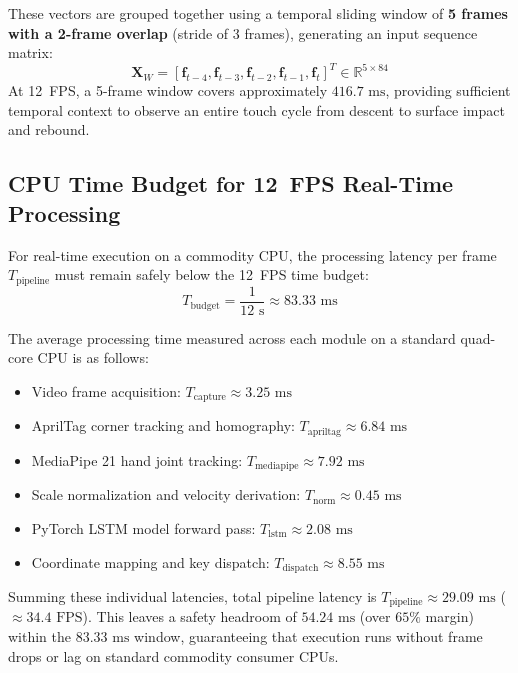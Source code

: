 These vectors are grouped together using a temporal sliding window of \textbf{5 frames with a 2-frame overlap} (stride of 3 frames), generating an input sequence matrix:
\begin{equation}
\mathbf{X}_W = \left[ \mathbf{f}_{t-4}, \mathbf{f}_{t-3}, \mathbf{f}_{t-2}, \mathbf{f}_{t-1}, \mathbf{f}_t \right]^T \in \mathbb{R}^{5 \times 84}
\label{eq:meth_window_matrix}
\end{equation}
At 12~FPS, a 5-frame window covers approximately $416.7\text{ ms}$, providing sufficient temporal context to observe an entire touch cycle from descent to surface impact and rebound.

\subsection{CPU Time Budget for 12~FPS Real-Time Processing}
\label{subsec:meth_timing_budget}
For real-time execution on a commodity CPU, the processing latency per frame $T_{\text{pipeline}}$ must remain safely below the 12~FPS time budget:
\begin{equation}
T_{\text{budget}} = \frac{1}{12\text{ s}} \approx 83.33\text{ ms}
\label{eq:meth_timing_budget}
\end{equation}

The average processing time measured across each module on a standard quad-core CPU is as follows:
\begin{itemize}
    \item Video frame acquisition: $T_{\text{capture}} \approx 3.25\text{ ms}$
    \item AprilTag corner tracking and homography: $T_{\text{apriltag}} \approx 6.84\text{ ms}$
    \item MediaPipe 21 hand joint tracking: $T_{\text{mediapipe}} \approx 7.92\text{ ms}$
    \item Scale normalization and velocity derivation: $T_{\text{norm}} \approx 0.45\text{ ms}$
    \item PyTorch LSTM model forward pass: $T_{\text{lstm}} \approx 2.08\text{ ms}$
    \item Coordinate mapping and key dispatch: $T_{\text{dispatch}} \approx 8.55\text{ ms}$
\end{itemize}

Summing these individual latencies, total pipeline latency is $T_{\text{pipeline}} \approx 29.09\text{ ms}$ ($\approx 34.4\text{ FPS}$). This leaves a safety headroom of $54.24\text{ ms}$ (over $65\%$ margin) within the $83.33\text{ ms}$ window, guaranteeing that execution runs without frame drops or lag on standard commodity consumer CPUs.

